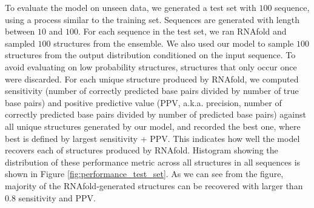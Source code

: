 \documentclass{article}
\begin{document}
To evaluate the model on unseen data, we generated a test set with $100$ sequence,
using a process similar to the training set.
Sequences are generated with length between $10$ and $100$.
For each sequence in the test set, we ran RNAfold and sampled $100$ structures from the ensemble.
We also used our model to sample $100$ structures from the output distribution conditioned on the input sequence.
To avoid evaluating on low probability structures, structures that only occur once were discarded.
For each unique structure produced by RNAfold, we computed sensitivity
(﻿number of correctly predicted base pairs divided by ﻿number of true base pairs) and
positive predictive value (PPV, a.k.a. precision, number of correctly predicted base pairs
divided by ﻿number of predicted base pairs)
against all unique structures generated by our model,
and recorded the best one, where best is defined by largest sensitivity + PPV.
This indicates how well the model recovers each of structures produced by RNAfold.
Histogram showing the distribution of these performance metric across all structures in all sequences is shown in Figure \ref{fig:performance_test_set}.
As we can see from the figure, majority of the RNAfold-generated structures can be recovered with larger than $0.8$ sensitivity and PPV.






%
%
%
\end{document}

